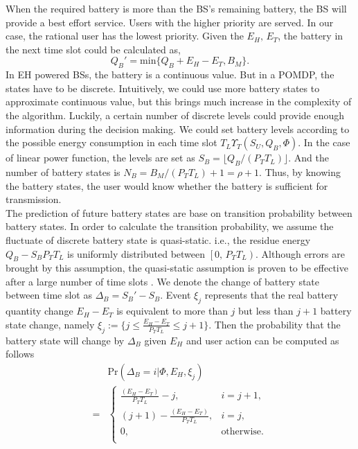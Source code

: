 \documentclass[conference]{IEEEtran}
\begin{document}
When the required battery is more than the BS's remaining battery,
the BS will provide a best effort service.
Users with the higher priority are served.
In our case, the rational user has the lowest priority.
Given the \(E_H,\,E_T\), the battery in the next time slot could be calculated as,
\begin{equation}
	Q_B' = \mbox{min}\{Q_B + E_H - E_T, B_M\}.
\end{equation}
\indent In EH powered BSs, the battery is a continuous value.
But in a POMDP, the states have to be discrete.
Intuitively, we could use more battery states to approximate continuous value,
but this brings much increase in the complexity of the algorithm.
Luckily, a certain number of discrete levels could provide enough information during the decision making.
We could set battery levels according to the possible energy consumption in each time slot \(T_L\Upsilon_T(S_U,Q_B,\Phi)\).
In the case of linear power function, the levels are set as \(S_B = \lfloor Q_B / \left(P_TT_L\right) \rfloor\).
And the number of battery states is \(N_B = B_M / \left(P_TT_L\right) +1 = \rho + 1\).
Thus, by knowing the battery states,
the user would know whether the battery is sufficient for transmission.\\
\indent
The prediction of future battery states are base on transition probability between battery states.
In order to calculate the transition probability,
we assume the fluctuate of discrete battery state is quasi-static.
i.e., the residue energy \(Q_B - S_BP_TT_L\) is uniformly distributed between \(\left[0,\,P_TT_L\right)\).
Although errors are brought by this assumption, the quasi-static assumption is proven to be effective after a large number of time slots \cite{data}.
We denote the change of battery state between time slot as \(\Delta_B = S_{B}' - S_B\).
Event \(\xi_j\) represents that the real battery quantity change \(E_H - E_T\)
is equivalent to more than \(j\) but less than \(j+1\) battery state change, namely
\(\xi_j := \{j\leq \frac{E_H - E_T}{P_TT_L} \le j+1\}\).
Then the probability that the battery state will change by \(\Delta_B\)
given \(E_H\) and user action can be computed as follows
\begin{align}&\mbox{Pr}\left(\Delta_B = i |\Phi, E_H, \xi_j \right)\nonumber\\
=&\begin{cases} \frac{\left(E_H - E_T\right)}{P_TT_L} -j, &\mbox{$i = j + 1$},\\
\left(j+1\right) -\frac{\left(E_H - E_T\right)} {P_TT_L}, &\mbox{$i = j$},\\
0, &\mbox{otherwise.}\\
\end{cases}
\end{align}
\end{document}
